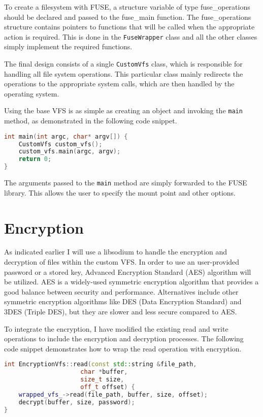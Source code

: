 To create a filesystem with FUSE, a structure variable of type fuse\_operations should be declared and passed to the fuse\_main function.
The fuse\_operations structure contains pointers to functions that will be called when the appropriate action is required.
This is  done in the \texttt{FuseWrapper} class and all the other classes simply implement the required functions.

The final design consists of a single \texttt{CustomVfs} class, which is responsible for handling all file system operations.
This particular class mainly redirects the operations to the appropriate system calls, which are then handled by the operating system.

Using the base VFS is as simple as creating an object and invoking the \texttt{main} method, as demonstrated in the following code snippet.

\begin{lstlisting}[language=c++, basicstyle=\ttfamily\small]
int main(int argc, char* argv[]) {
    CustomVfs custom_vfs();
    custom_vfs.main(argc, argv);
    return 0;
}
\end{lstlisting}

The arguments passed to the \texttt{main} method are simply forwarded to the FUSE library.
This allows the user to specify the mount point and other options.


\section{Encryption}\label{sec:encryption}

As indicated earlier I will use a libsodium to handle the encryption and decryption of files within the custom VFS\@.
In order to use an user-provided password or a stored key, Advanced Encryption Standard (AES) algorithm will be utilized.
AES is a widely-used symmetric encryption algorithm that provides a good balance between security and performance.
Alternatives include other symmetric encryption algorithms like DES (Data Encryption Standard) and 3DES (Triple DES), but they are slower and less secure compared to AES.

To integrate the encryption, I have modified the existing read and write operations to include the encryption and decryption processes.
The following code snippet demonstrates how to wrap the read operation with encryption.

\begin{lstlisting}[language=c++, basicstyle=\ttfamily\small]
int EncryptionVfs::read(const std::string &file_path,
                     char *buffer,
                     size_t size,
                     off_t offset) {
    wrapped_vfs_->read(file_path, buffer, size, offset);
    decrypt(buffer, size, password);
}
\end{lstlisting}

